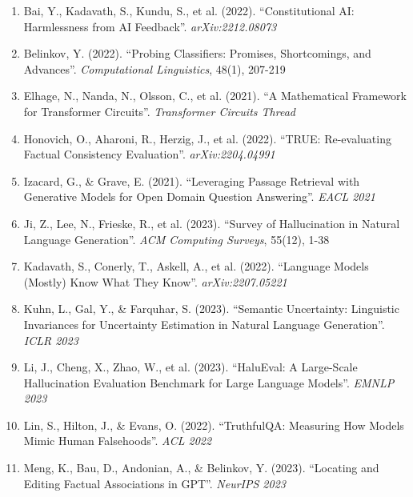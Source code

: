 \documentclass[11pt]{article}
\begin{document}
\begin{enumerate}
    \item Bai, Y., Kadavath, S., Kundu, S., et al. (2022). ``Constitutional AI: Harmlessness from AI Feedback''. \textit{arXiv:2212.08073}

    \item Belinkov, Y. (2022). ``Probing Classifiers: Promises, Shortcomings, and Advances''. \textit{Computational Linguistics}, 48(1), 207-219

    \item Elhage, N., Nanda, N., Olsson, C., et al. (2021). ``A Mathematical Framework for Transformer Circuits''. \textit{Transformer Circuits Thread}

    \item Honovich, O., Aharoni, R., Herzig, J., et al. (2022). ``TRUE: Re-evaluating Factual Consistency Evaluation''. \textit{arXiv:2204.04991}

    \item Izacard, G., \& Grave, E. (2021). ``Leveraging Passage Retrieval with Generative Models for Open Domain Question Answering''. \textit{EACL 2021}

    \item Ji, Z., Lee, N., Frieske, R., et al. (2023). ``Survey of Hallucination in Natural Language Generation''. \textit{ACM Computing Surveys}, 55(12), 1-38

    \item Kadavath, S., Conerly, T., Askell, A., et al. (2022). ``Language Models (Mostly) Know What They Know''. \textit{arXiv:2207.05221}

    \item Kuhn, L., Gal, Y., \& Farquhar, S. (2023). ``Semantic Uncertainty: Linguistic Invariances for Uncertainty Estimation in Natural Language Generation''. \textit{ICLR 2023}

    \item Li, J., Cheng, X., Zhao, W., et al. (2023). ``HaluEval: A Large-Scale Hallucination Evaluation Benchmark for Large Language Models''. \textit{EMNLP 2023}

    \item Lin, S., Hilton, J., \& Evans, O. (2022). ``TruthfulQA: Measuring How Models Mimic Human Falsehoods''. \textit{ACL 2022}

    \item Meng, K., Bau, D., Andonian, A., \& Belinkov, Y. (2023). ``Locating and Editing Factual Associations in GPT''. \textit{NeurIPS 2023}


\end{enumerate}
\end{document}
